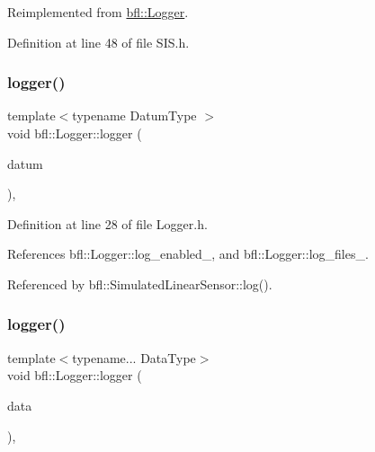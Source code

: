 Reimplemented from \mbox{\hyperlink{classbfl_1_1Logger_a328ceaa8e70e6918f11142b12b8be217}{bfl\+::\+Logger}}.



Definition at line 48 of file S\+I\+S.\+h.

\mbox{\label{classbfl_1_1Logger_a1033ff31398484f2132f84fd140da9e3}} 
\subsubsection{\texorpdfstring{logger()}{logger()}\hspace{0.1cm}{\footnotesize\ttfamily [1/4]}}
{\footnotesize\ttfamily template$<$typename Datum\+Type $>$ \\
void bfl\+::\+Logger\+::logger (\begin{DoxyParamCaption}\item[{Datum\+Type}]{datum }\end{DoxyParamCaption})\hspace{0.3cm}{\ttfamily [inline]}, {\ttfamily [inherited]}}



Definition at line 28 of file Logger.\+h.



References bfl\+::\+Logger\+::log\+\_\+enabled\+\_\+, and bfl\+::\+Logger\+::log\+\_\+files\+\_\+.



Referenced by bfl\+::\+Simulated\+Linear\+Sensor\+::log().

\mbox{\label{classbfl_1_1Logger_aca2086c9256e5c404872b91f7f25b97d}} 
\subsubsection{\texorpdfstring{logger()}{logger()}\hspace{0.1cm}{\footnotesize\ttfamily [2/4]}}
{\footnotesize\ttfamily template$<$typename... Data\+Type$>$ \\
void bfl\+::\+Logger\+::logger (\begin{DoxyParamCaption}\item[{Data\+Type...}]{data }\end{DoxyParamCaption})\hspace{0.3cm}{\ttfamily [inline]}, {\ttfamily [inherited]}}



